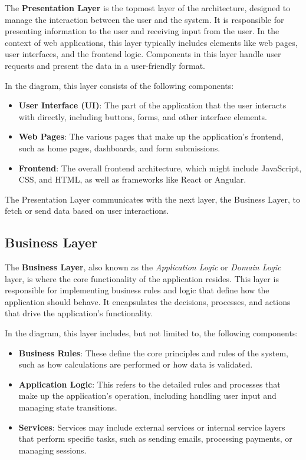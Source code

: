 The \textbf{Presentation Layer} is the topmost layer of the architecture, designed to manage the interaction between the user and the system. It is responsible for presenting information to the user and receiving input from the user. In the context of web applications, this layer typically includes elements like web pages, user interfaces, and the frontend logic. Components in this layer handle user requests and present the data in a user-friendly format.

In the diagram, this layer consists of the following components:
\begin{itemize}
	\item \textbf{User Interface (UI)}: The part of the application that the user interacts with directly, including buttons, forms, and other interface elements.
	\item \textbf{Web Pages}: The various pages that make up the application’s frontend, such as home pages, dashboards, and form submissions.
	\item \textbf{Frontend}: The overall frontend architecture, which might include JavaScript, CSS, and HTML, as well as frameworks like React or Angular.
\end{itemize}

The Presentation Layer communicates with the next layer, the Business Layer, to fetch or send data based on user interactions.

\subsection{Business Layer}

The \textbf{Business Layer}, also known as the \textit{Application Logic} or \textit{Domain Logic} layer, is where the core functionality of the application resides. This layer is responsible for implementing business rules and logic that define how the application should behave. It encapsulates the decisions, processes, and actions that drive the application’s functionality. 

In the diagram, this layer includes, but not limited to, the following components:
\begin{itemize}
	\item \textbf{Business Rules}: These define the core principles and rules of the system, such as how calculations are performed or how data is validated.
	\item \textbf{Application Logic}: This refers to the detailed rules and processes that make up the application’s operation, including handling user input and managing state transitions.
	\item \textbf{Services}: Services may include external services or internal service layers that perform specific tasks, such as sending emails, processing payments, or managing sessions.
\end{itemize}

